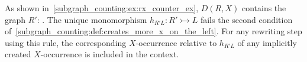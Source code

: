 \begin{example}
    As shown in~\autoref{subgraph_counting:ex:rx_counter_ex}, \( D(R,X) \) contains the graph $R'$:
    . The unique monomorphism $h_{R'L}:R' \rightarrowtail L$ fails the second condition of~\autoref{subgraph_counting:def:creates_more_x_on_the_left}. 
    For any rewriting step using this rule, the corresponding $X$-occurrence relative to $h_{R'L}$ of any implicitly created $X$-occurrence is included in the context.
\end{example}
